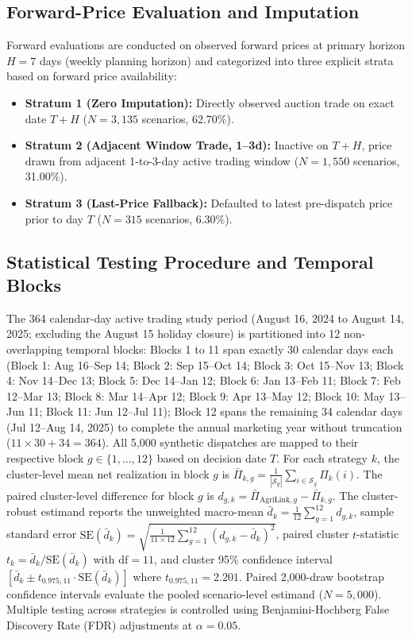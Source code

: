 \documentclass[journal]{IEEEtran}
\begin{document}
\subsection{Forward-Price Evaluation and Imputation}
Forward evaluations are conducted on observed forward prices at primary horizon $H = 7$ days (weekly planning horizon) and categorized into three explicit strata based on forward price availability:
\begin{itemize}
    \item \textbf{Stratum 1 (Zero Imputation):} Directly observed auction trade on exact date $T+H$ ($N = 3,135$ scenarios, 62.70\%).
    \item \textbf{Stratum 2 (Adjacent Window Trade, 1--3d):} Inactive on $T+H$, price drawn from adjacent 1-to-3-day active trading window ($N = 1,550$ scenarios, 31.00\%).
    \item \textbf{Stratum 3 (Last-Price Fallback):} Defaulted to latest pre-dispatch price prior to day $T$ ($N = 315$ scenarios, 6.30\%).
\end{itemize}

\subsection{Statistical Testing Procedure and Temporal Blocks}
The 364 calendar-day active trading study period (August 16, 2024 to August 14, 2025; excluding the August 15 holiday closure) is partitioned into 12 non-overlapping temporal blocks: Blocks 1 to 11 span exactly 30 calendar days each (Block 1: Aug 16--Sep 14; Block 2: Sep 15--Oct 14; Block 3: Oct 15--Nov 13; Block 4: Nov 14--Dec 13; Block 5: Dec 14--Jan 12; Block 6: Jan 13--Feb 11; Block 7: Feb 12--Mar 13; Block 8: Mar 14--Apr 12; Block 9: Apr 13--May 12; Block 10: May 13--Jun 11; Block 11: Jun 12--Jul 11); Block 12 spans the remaining 34 calendar days (Jul 12--Aug 14, 2025) to complete the annual marketing year without truncation ($11 \times 30 + 34 = 364$). All 5,000 synthetic dispatches are mapped to their respective block $g \in \{1, \dots, 12\}$ based on decision date $T$. For each strategy $k$, the cluster-level mean net realization in block $g$ is $\bar{\Pi}_{k, g} = \frac{1}{|\mathcal{S}_g|}\sum_{i \in \mathcal{S}_g}\Pi_k(i)$. The paired cluster-level difference for block $g$ is $d_{g, k} = \bar{\Pi}_{\text{AgriLink}, g} - \bar{\Pi}_{k, g}$. The cluster-robust estimand reports the unweighted macro-mean $\bar{d}_k = \frac{1}{12}\sum_{g=1}^{12} d_{g, k}$, sample standard error $\text{SE}(\bar{d}_k) = \sqrt{\frac{1}{11\times 12}\sum_{g=1}^{12}(d_{g,k}-\bar{d}_k)^2}$, paired cluster $t$-statistic $t_k = \bar{d}_k / \text{SE}(\bar{d}_k)$ with $\text{df} = 11$, and cluster 95\% confidence interval $[\bar{d}_k \pm t_{0.975, 11}\cdot\text{SE}(\bar{d}_k)]$ where $t_{0.975, 11} = 2.201$. Paired 2,000-draw bootstrap confidence intervals evaluate the pooled scenario-level estimand ($N = 5,000$). Multiple testing across strategies is controlled using Benjamini-Hochberg False Discovery Rate (FDR) adjustments at $\alpha = 0.05$.
\end{document}
